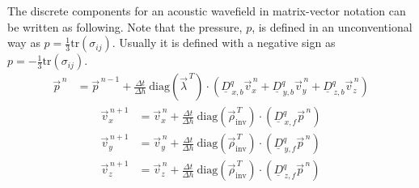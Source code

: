 \documentclass[pdftex,a4paper,parskip,listof=totoc,bibliography=totoc,onehalfspacing,12pt]{scrreprt}
\begin{document}
The discrete components for an acoustic wavefield in matrix-vector notation can be written as following. Note that the pressure, $p$, is defined in an unconventional way as $p=\frac{1}{3}\mathrm{tr}(\sigma_{ij})$. Usually it is defined with a negative sign as $p=-\frac{1}{3}\mathrm{tr}(\sigma_{ij})$.
\begin{align*}
	\vec{p}^{\,n} &= \vec{p}^{\,n-1} + \frac{\Delta t}{\Delta h}~ \mathrm{diag} \left( \vec{\lambda}^{\,T} \right) \cdot \left( \underline{D}_{\,x,b}^q \vec{v}_x^{\,n} +\underline{D}_{\,y,b}^q \vec{v}_y^{\,n} + \underline{D}_{\,z,b}^q \vec{v}_z^{\,n} \right) 
\end{align*}
\begin{align*}
	\vec{v}_x^{\,n+1} &= \vec{v}_x^{\,n} + \frac{\Delta t}{\Delta h} ~ \mathrm{diag} \left( \vec{\rho}_\mathrm{inv}^{\,T} \right) \cdot \left( \underline{D}_{\,x,f}^q \vec{p}^{\,n}  \right)\\
	\vec{v}_y^{\,n+1} &= \vec{v}_y^{\,n} + \frac{\Delta t}{\Delta h} ~ \mathrm{diag} \left( \vec{\rho}_\mathrm{inv}^{\,T} \right) \cdot \left( \underline{D}_{\,y,f}^q \vec{p}^{\,n} \right)\\
	\vec{v}_z^{\,n+1} &= \vec{v}_z^{\,n} + \frac{\Delta t}{\Delta h} ~ \mathrm{diag}  \left( \vec{\rho}_\mathrm{inv}^{\,T} \right) \cdot\left( \underline{D}_{\,z,f}^q \vec{p}^{\,n} \right)\\
\end{align*}
\end{document}

